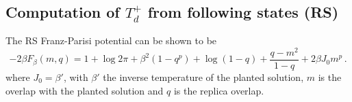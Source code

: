 \documentclass[]{article}
\theoremstyle{plain}%
\theoremstyle{definition}%
\theoremstyle{remark}%
\begin{document}




\newpage
\subsection{Computation of $T_d^+$ from following states (RS)}
The RS Franz-Parisi potential can be shown to be
\begin{equation}\label{eq:FP_RS_spherical}
    -2\beta F_\beta(m,q) = 1 + \log 2\pi + \beta^2(1-q^p) + \log(1-q) + \frac{q-m^2}{1-q} + 2\beta J_0 m^p\,.
\end{equation}
where $J_0 = \beta' $, with $\beta'$ the inverse temperature of the planted solution, $m$ is the overlap with the planted solution and $q$ is the replica overlap.
\end{document}
